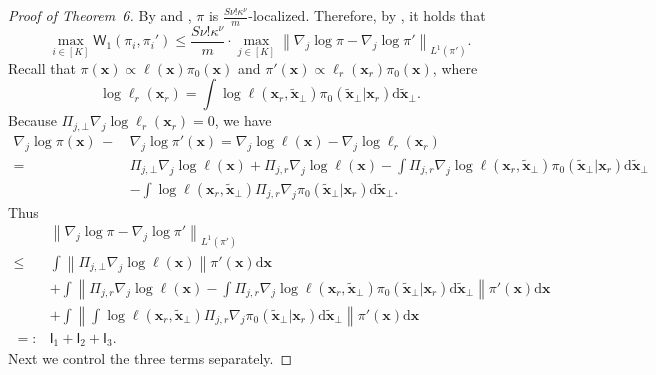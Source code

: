 \documentclass[10pt,a4paper]{amsart}
\newcommand{\bx}{{\boldsymbol{x}}}
\newcommand{\mdd}{\mathrm{d}}
\newcommand{\norm}[1]{\left\|#1\right\|}
\newcommand{\sfI}{\mathsf{I}}
\newcommand{\sfW}{\mathsf{W}}
\begin{document}
\begin{proof}[Proof of Theorem~6]

By  and , $\pi$ is $\frac{S\nu! \kappa^\nu}{m}$-localized.
Therefore, by , it holds that 
\[
    \max_{i \in [K]} \sfW_1(\pi_i,\pi_i') \le \frac{S\nu! \kappa^\nu}{m} \cdot \max_{j \in [K]} \norm{ \nabla_j \log \pi - \nabla_j \log \pi' }_{L^1(\pi')}.
\]
Recall that $\pi(\bx) \propto \ell(\bx) \pi_0(\bx)$ and $\pi'(\bx) \propto \ell_r(\bx_r) \pi_0(\bx)$, where
\[
    \log \ell_r(\bx_r) = \int \log \ell(\bx_r,\widetilde{\bx}_\bot) \pi_0(\widetilde{\bx}_\bot|\bx_r) \mdd \widetilde{\bx}_\bot.
\]
Because $\Pi_{j,\bot}\nabla_j \log \ell_r(\bx_r)=0$, we have
\begin{align*}
    \nabla_j \log \pi (\bx) \,-\, &\nabla_j \log \pi' (\bx) = \nabla_j \log \ell (\bx) - \nabla_j \log \ell_r (\bx_r) \\
    =~& \Pi_{j,\bot} \nabla_j \log \ell (\bx) + \Pi_{j,r} \nabla_j \log \ell (\bx) - \int \Pi_{j,r} \nabla_j \log \ell(\bx_r,\widetilde{\bx}_\bot) \pi_0(\widetilde{\bx}_\bot|\bx_r) \mdd \widetilde{\bx}_\bot \\
    &- \int \log \ell(\bx_r,\widetilde{\bx}_\bot) \Pi_{j,r} \nabla_j \pi_0(\widetilde{\bx}_\bot|\bx_r) \mdd \widetilde{\bx}_\bot. 
\end{align*}
Thus
\begin{equation}
\label{eqn:pf_LLIS_err_decomp}
\begin{split}
    &\norm{ \nabla_j \log \pi - \nabla_j \log \pi' }_{L^1(\pi')} \\
    \le~& \int \norm{ \Pi_{j,\bot} \nabla_j \log \ell (\bx) } \pi'(\bx) \mdd \bx \\
    &+ \int \norm{ \Pi_{j,r} \nabla_j \log \ell (\bx) - \int \Pi_{j,r} \nabla_j \log \ell(\bx_r,\widetilde{\bx}_\bot) \pi_0(\widetilde{\bx}_\bot|\bx_r) \mdd \widetilde{\bx}_\bot } \pi'(\bx) \mdd \bx \\
    &+ \int \norm{ \int \log \ell(\bx_r,\widetilde{\bx}_\bot) \Pi_{j,r} \nabla_j \pi_0(\widetilde{\bx}_\bot|\bx_r) \mdd \widetilde{\bx}_\bot } \pi'(\bx) \mdd \bx \\
    =:& \sfI_1 + \sfI_2 + \sfI_3.
\end{split}
\end{equation}
Next we control the three terms separately.


\end{proof}
\end{document}
